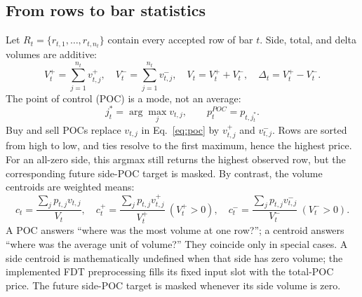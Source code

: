 \documentclass[10pt]{article}
\begin{document}
\subsection{From rows to bar statistics}

Let $R_t=\{r_{t,1},\ldots,r_{t,n_t}\}$ contain every accepted row of bar $t$. Side, total, and delta
volumes are additive:
\begin{equation}
V_t^+=\sum_{j=1}^{n_t}v^+_{t,j},\quad
V_t^-=\sum_{j=1}^{n_t}v^-_{t,j},\quad
V_t=V_t^++V_t^-,\quad
\Delta_t=V_t^+-V_t^-.
\label{eq:bar-volumes}
\end{equation}
The point of control (POC) is a mode, not an average:
\begin{equation}
j_t^*=\arg\max_j v_{t,j},\qquad p_t^{POC}=p_{t,j_t^*}.
\label{eq:poc}
\end{equation}
Buy and sell POCs replace $v_{t,j}$ in Eq.~\eqref{eq:poc} by $v^+_{t,j}$ and $v^-_{t,j}$.
Rows are sorted from high to low, and ties resolve to the first maximum, hence the highest price.
For an all-zero side, this argmax still returns the highest observed row, but the corresponding future
side-POC target is masked. By contrast, the volume centroids are weighted means:
\begin{equation}
c_t=\frac{\sum_j p_{t,j}v_{t,j}}{V_t},\quad
c_t^+=\frac{\sum_j p_{t,j}v^+_{t,j}}{V_t^+}\ (V_t^+>0),\quad
c_t^-=\frac{\sum_j p_{t,j}v^-_{t,j}}{V_t^-}\ (V_t^->0).
\label{eq:centroids}
\end{equation}
A POC answers ``where was the most volume at one row?''; a centroid answers ``where was the average
unit of volume?'' They coincide only in special cases. A side centroid is mathematically undefined
when that side has zero volume; the implemented FDT preprocessing fills its fixed input slot with the
total-POC price. The future side-POC target is masked whenever its side volume is zero.
\end{document}
